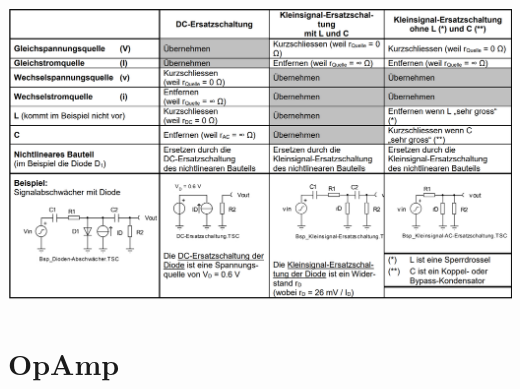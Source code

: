 \documentclass[margin=normal]{tex/hsrzf}
\begin{document}
\includegraphics[width = 15cm]{img/Tabelle Kleinsignal Ersatzschaltung.png}

\section{OpAmp}
\end{document}
